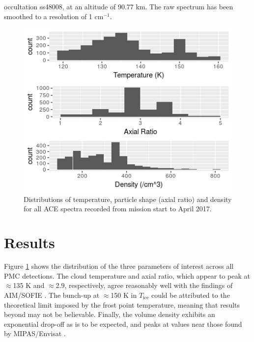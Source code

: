 \documentclass[]{elsarticle}
\begin{document}
occultation ss48008, at an altitude of 90.77 km. The raw spectrum has been smoothed to a resolution of 1 cm$^{-1}$. 
\begin{figure}
	\includegraphics{figs/allHistograms}
	\caption{Distributions of temperature, particle shape (axial ratio) and density for all ACE spectra recorded from mission start to April 2017.}
	\label{fig:Fig2}
\end{figure}

\section{Results} \label{sec:results}
Figure \ref{fig:Fig2} shows the distribution of the three parameters of interest across all PMC detections. The cloud temperature and axial ratio, which appear to peak at $\approx$135 K and $\approx$2.9, respectively, agree reasonably well with the findings of AIM/SOFIE \cite{Hervig2010}. The bunch-up at $\approx$150 K in $T_{\text{ice}}$ could be attributed to the theoretical limit imposed by the frost point temperature, meaning that results beyond may not be believable. Finally, the volume density exhibits an exponential drop-off as is to be expected, and peaks at values near those found by MIPAS/Envisat \cite{Garcia-Comas2016}.  
\end{document}
